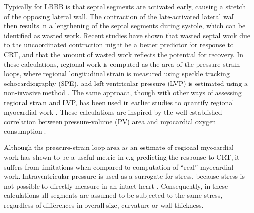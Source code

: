 Typically for LBBB is that septal segments are activated early,
causing a stretch of the opposing lateral wall. The 
contraction of the late-activated lateral wall then results in a 
lengthening of the septal segments during systole, which can be
identified as wasted work. Recent studies 
\cite{vecera2016wasted} have shown that wasted septal work due to the
uncoordinated contraction might be a better predictor for response to
CRT, and that the amount of wasted work reflects the potential for
recovery. In these calculations, regional work is computed as the area
of the pressure-strain loops, where regional longitudinal strain is
measured using speckle tracking echocardiography (SPE), and left
ventricular pressure (LVP) is estimated using a non-invasive method
\cite{russell2012novel}. The same approach, though with other ways of
assessing regional strain and LVP, has been used in earlier studies to
quantify regional myocardial work
\cite{tyberg1974analysis,theroux1974regional}. These calculations are
inspired by the well established correlation between pressure-volume
(PV) area and myocardial oxygen consumption \cite{suga1979total}.



Although the pressure-strain loop area as an estimate of regional
myocardial work has shown to be a useful metric in e.g predicting the
response to CRT, it suffers from limitations when compared to computation of 
``real'' myocardial work. Intraventricular pressure is
used as a surrogate for stress, because stress is not possible to
directly measure in an intact heart
\cite{huisman1980measurement}. Consequently, in these calculations all
segments are assumed to be subjected to the same stress, regardless of
differences in overall size, curvature or wall thickness.  


